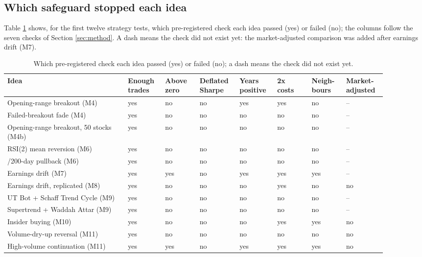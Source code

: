 \documentclass[11pt,a4paper]{article}
\begin{document}
\subsection{Which safeguard stopped each idea}\label{which-safeguard-stopped-each-idea}

Table \ref{tbl:matrix} shows, for the first twelve strategy tests, which pre-registered check each idea passed (yes) or failed (no); the columns
follow the seven checks of Section \ref{sec:method}. A dash means the check did not exist yet: the market-adjusted comparison was added after
earnings drift (M7).

\begin{table}[tbp]
\centering
\caption{Which pre-registered check each idea passed (yes) or failed (no); a dash means the check did not exist yet.}\label{tbl:matrix}
\setlength{\tabcolsep}{3pt}
\begin{tabular}{@{}>{\raggedright\arraybackslash}p{0.28\linewidth}*{7}{>{\centering\arraybackslash}p{0.088\linewidth}}@{}}
\toprule
Idea & \shortstack{Enough\\trades} & \shortstack{Above\\zero} & \shortstack{Deflated\\Sharpe} & \shortstack{Years\\positive} & \shortstack{2x\\costs} & \shortstack{Neigh-\\bours} & \shortstack{Market-\\adjusted} \\
\midrule
Opening-range breakout (M4) & yes & no & no & yes & yes & no & -- \\
Failed-breakout fade (M4) & yes & no & no & no & no & no & -- \\
Opening-range breakout, 50 stocks (M4b) & yes & no & no & no & no & no & -- \\
RSI(2) mean reversion (M6) & yes & no & no & no & no & no & -- \\
20/200-day pullback (M6) & yes & no & no & no & no & no & -- \\
Earnings drift (M7) & yes & yes & no & yes & yes & yes & -- \\
Earnings drift, replicated (M8) & yes & no & no & no & yes & no & no \\
UT Bot + Schaff Trend Cycle (M9) & yes & no & no & no & no & no & -- \\
Supertrend + Waddah Attar (M9) & yes & no & no & no & no & no & -- \\
Insider buying (M10) & yes & no & no & no & yes & yes & no \\
Volume-dry-up reversal (M11) & yes & no & no & no & no & no & no \\
High-volume continuation (M11) & yes & yes & no & yes & yes & yes & no \\
\bottomrule
\end{tabular}
\end{table}
\end{document}
